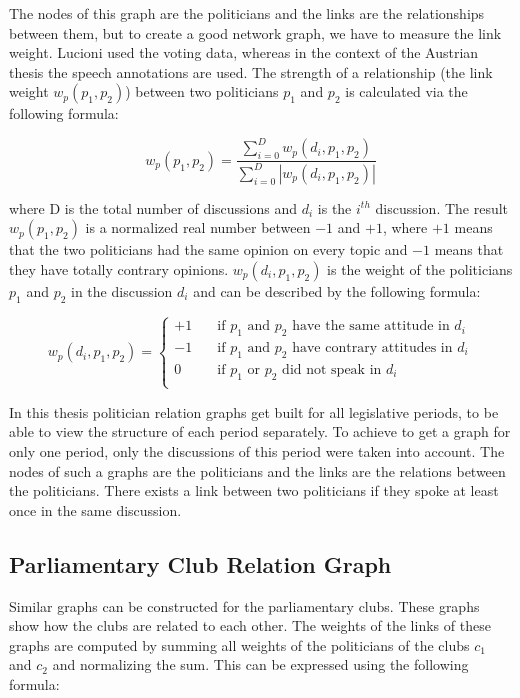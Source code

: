 The nodes of this graph are the politicians and the links are the relationships between them, but to create a good network graph, we have to measure the link weight. Lucioni \cite{Lucioni_2015} used the voting data, whereas in the context of the Austrian thesis the speech annotations are used. The strength of a relationship (the link weight $w_p(p_1,p_2)$) between two politicians $p_1$ and $p_2$ is calculated via the following formula:

$$w_p(p_1,p_2) = \frac{\displaystyle\sum_{i=0}^{D} w_p(d_i,p_1,p_2)}{\displaystyle\sum_{i=0}^{D} |w_p(d_i,p_1,p_2)|}$$

where D is the total number of discussions and $d_i$ is the $i^{th}$ discussion. The result $w_p(p_1,p_2)$ is a normalized real number between $-1$ and $+1$, where $+1$ means that the two politicians had the same opinion on every topic and $-1$ means that they have totally contrary opinions. $w_p(d_i,p_1,p_2)$ is the weight of the politicians $p_1$ and $p_2$ in the discussion $d_i$ and can be described by the following formula:

$$w_p(d_i,p_1,p_2) = 
\begin{cases}
    +1       & \quad \text{if } p_1 \text{ and } p_2 \text{ have the same attitude in } d_i\\
    -1  & \quad \text{if } p_1 \text{ and } p_2 \text{ have contrary attitudes in } d_i\\
        0       & \quad \text{if } p_1 \text{ or } p_2 \text{ did not speak in } d_i\\
\end{cases}
$$

In this thesis politician relation graphs get built for all legislative periods, to be able to view the structure of each period separately. To achieve to get a graph for only one period, only the discussions of this period were taken into account. The nodes of such a graphs are the politicians and the links are the relations between the politicians. There exists a link between two politicians if they spoke at least once in the same discussion.

\subsection{Parliamentary Club Relation Graph}
Similar graphs can be constructed for the parliamentary clubs. These graphs show how the clubs are related to each other. The weights of the links of these graphs are computed by summing all weights of the politicians of the clubs $c_1$ and $c_2$ and normalizing the sum. This can be expressed using the following formula:

